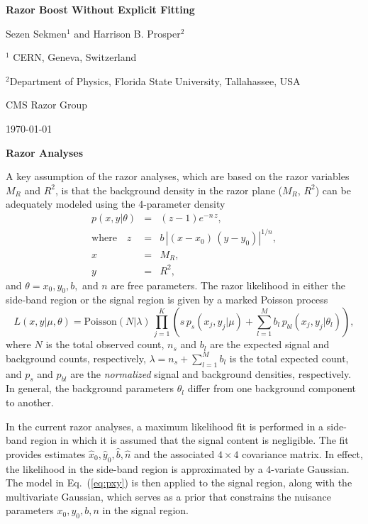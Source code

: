 \documentclass[aps,prd,preprint]{revtex4}
\begin{document}
\centerline{\bf \large Razor Boost Without Explicit Fitting}

\centerline{Sezen Sekmen$^1$ and Harrison B. Prosper$^2$}

\centerline{$^1$ CERN, Geneva, Switzerland}
\centerline{$^2$Department of Physics, Florida State University, Tallahassee, USA}

\centerline{CMS Razor Group}
\centerline{\today}

\bigskip

\bigskip

\noindent
{\bf \large Razor Analyses}

A key assumption of the razor analyses, which are based on the razor variables $M_R$ and $R^2$, is that the background density in the razor plane ($M_R$, $R^2$) can be adequately modeled using the
4-parameter density
\begin{eqnarray}
p(x, y|\theta) & = & (z - 1) e^{-n \, z}, \nonumber \\
	\text{where}\quad z 	& = & b \, |(x - x_0) \, (y - y_0)|^{1/n}, \nonumber \\
				x	& = & M_R, \nonumber \\
				y	& = & R^2, 
				\label{eq:pxy}
\end{eqnarray}
and $\theta = x_0, y_0, b, $ and $n$ are free parameters. The razor likelihood in
either the side-band region or the signal region is given by a
marked Poisson process
\begin{equation}
	L(x, y|\mu, \theta) = \text{Poisson}(N|\lambda) \, \prod_{j=1}^K \left( s \, p_s(x_j, y_j|\mu) + \sum_{l=1}^M b_l \, p_{bl}(x_j, y_j|\theta_l) \right),
\end{equation}
where $N$ is the total observed count, $n_s$ and $b_l$ are the expected signal and background counts, respectively, $\lambda = n_s + \sum_{l=1}^M b_l$ is the total expected count, and
$p_s$ and $p_{bl}$ are the \emph{normalized} signal and background
densities, respectively. In general, the background parameters $\theta_l$ differ from one background component to another.

In the current razor analyses, a maximum likelihood fit is performed in a side-band region
in which it is assumed that the signal content is negligible. The fit provides estimates 
$\hat{x}_0, \hat{y}_0, \hat{b}, \hat{n}$ and the associated $4 \times 4$ covariance matrix. 
In effect, the likelihood in the side-band region is approximated by a 4-variate Gaussian.
The
model in Eq.~(\ref{eq:pxy}) is then applied to the signal region, along with the
multivariate Gaussian, which serves as a prior that constrains the nuisance
parameters $x_0, y_0, b, n$ in the signal region. 
\end{document}
